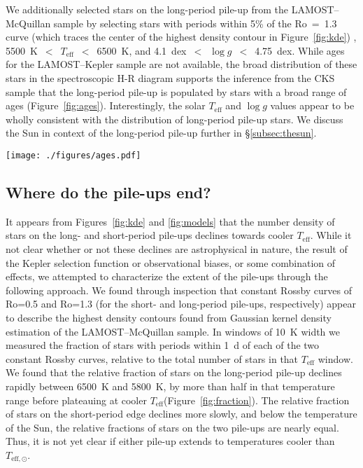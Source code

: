 \documentclass[linenumbers,tighten,trackchanges,twocolumn]{aastex631}
\newcommand{\lamostkep}{LAMOST--Kepler\xspace}
\newcommand{\lamostmcq}{LAMOST--McQuillan\xspace}
\newcommand{\teff}{\ensuremath{T_{\mathrm{eff}}}\xspace}
\newcommand{\logg}{\ensuremath{\log g}\xspace}
\newcommand{\tsun}{$T_\mathrm{eff,\odot}$\xspace}
\begin{document}
We additionally selected stars on the long-period pile-up from the \lamostmcq sample by selecting stars with periods within 5\% of the Ro~=~1.3 curve (which traces the center of the highest density contour in Figure~\ref{fig:kde}) , 5500~K~$<$~\teff~$<$~6500~K, and 4.1~dex~$<$~\logg~$<$~4.75~dex. While ages for the \lamostkep sample are not available, the broad distribution of these stars in the spectroscopic H-R diagram supports the inference from the CKS sample that the long-period pile-up is populated by stars with a broad range of ages (Figure~\ref{fig:ages}). Interestingly, the solar \teff and \logg values appear to be wholly consistent with the distribution of long-period pile-up stars. We discuss the Sun in context of the long-period pile-up further in \S\ref{subsec:thesun}.

\begin{figure*}
    \centering
    \texttt{[image: ./figures/ages.pdf]}
    \caption{Above, H-R diagram placement of long-period pile-up stars relative to the Sun and the CKS sample (a) and similarly for the LAMOST--Kepler sample (b). Below, the \teff-age plane for CKS stars along the long-period pile-up using isochrone ages from the CKS (c) and SPOCS (d) catalogs.}
    \label{fig:ages}
\end{figure*}

\subsection{Where do the pile-ups end?} \label{subsec:extent}
It appears from Figures~\ref{fig:kde} and \ref{fig:models} that the number density of stars on the long- and short-period pile-ups declines towards cooler \teff. While it not clear whether or not these declines are astrophysical in nature, the result of the Kepler selection function or observational biases, or some combination of effects, we attempted to characterize the extent of the pile-ups through the following approach. We found through inspection that constant Rossby curves of Ro=0.5 and Ro=1.3 (for the short- and long-period pile-ups, respectively) appear to describe the highest density contours found from Gaussian kernel density estimation of the \lamostmcq sample. In windows of 10~K width we measured the fraction of stars with periods within 1~d of each of the two constant Rossby curves, relative to the total number of stars in that \teff window. We found that the relative fraction of stars on the long-period pile-up declines rapidly between 6500~K and 5800~K, by more than half in that temperature range before plateauing at cooler \teff (Figure~\ref{fig:fraction}). The relative fraction of stars on the short-period edge declines more slowly, and below the temperature of the Sun, the relative fractions of stars on the two pile-ups are nearly equal. Thus, it is not yet clear if either pile-up extends to temperatures cooler than \tsun.
\end{document}
